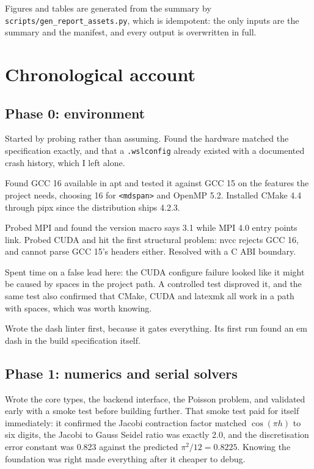 \documentclass[11pt,a4paper]{report}
\begin{document}
Figures and tables are generated from the summary by
\texttt{scripts/gen\_report\_assets.py}, which is idempotent: the only inputs are
the summary and the manifest, and every output is overwritten in full.

\chapter{Chronological account}

\section{Phase 0: environment}

Started by probing rather than assuming. Found the hardware matched the
specification exactly, and that a \texttt{.wslconfig} already existed with a
documented crash history, which I left alone.

Found GCC 16 available in apt and tested it against GCC 15 on the features the
project needs, choosing 16 for \texttt{<mdspan>} and OpenMP 5.2. Installed CMake
4.4 through pipx since the distribution ships 4.2.3.

Probed MPI and found the version macro says 3.1 while MPI 4.0 entry points link.
Probed CUDA and hit the first structural problem: nvcc rejects GCC 16, and cannot
parse GCC 15's headers either. Resolved with a C ABI boundary.

Spent time on a false lead here: the CUDA configure failure looked like it might
be caused by spaces in the project path. A controlled test disproved it, and the
same test also confirmed that CMake, CUDA and latexmk all work in a path with
spaces, which was worth knowing.

Wrote the dash linter first, because it gates everything. Its first run found an
em dash in the build specification itself.

\section{Phase 1: numerics and serial solvers}

Wrote the core types, the backend interface, the Poisson problem, and validated
early with a smoke test before building further. That smoke test paid for itself
immediately: it confirmed the Jacobi contraction factor matched $\cos(\pi h)$ to
six digits, the Jacobi to Gauss Seidel ratio was exactly 2.0, and the
discretisation error constant was 0.823 against the predicted $\pi^2/12 =
0.8225$. Knowing the foundation was right made everything after it cheaper to
debug.
\end{document}
